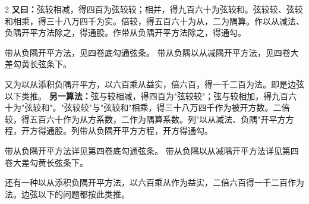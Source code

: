 \documentclass[11pt,a4paper]{article}
\begin{document}
\begin{paracol}{2}
\switchcolumn*
\small\textbf{又曰：}弦较相减，得四百为弦较较；相并，得九百六十为弦较和。弦较较、弦较和相乘，得三十八万四千为实。倍较，得五百六十为从，二为隅算。作以从减法、负隅开平方法除之，得通股。作带从负隅开平方法除之，得通勾。

带从负隅开平方法，见四卷底勾通弦条。
带从负隅以从减隅开平方法，见四卷大差勾黄长弦条下。

又为以从添积负隅开平方，以六百乘从益实，倍六百，得一千二百为法。即是边弦以下类推。
\switchcolumn
\small\textbf{另一算法：}弦与较相减，得四百为"弦较较"；弦与较相加，得九百六十为"弦较和"。"弦较较"与"弦较和"相乘，得三十八万四千作为被开方数。二倍较，得五百六十作为从方系数，二作为隅算系数。列"以从减法、负隅"开平方方程，开方得通股。列带从负隅开平方方程，开方得通勾。

带从负隅开平方法详见第四卷底勾通弦条。
带从负隅以从减隅开平方法详见第四卷大差勾黄长弦条下。

还有一种以从添积负隅开平方法，以六百乘从作为益实，二倍六百得一千二百作为法。边弦以下的问题都按此类推。
\end{paracol}
\end{document}
